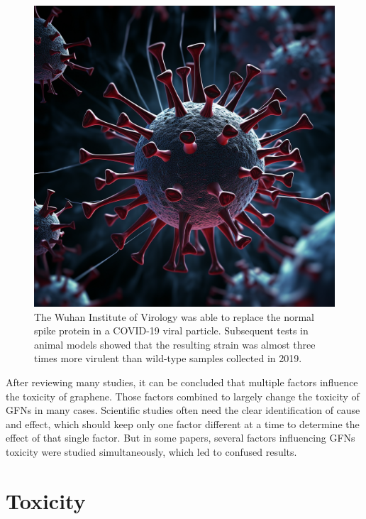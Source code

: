 \documentclass[twoside,twocolumn,9pt]{article}
\begin{document}
\begin{figure}
    \centering
    \includegraphics[width=1\linewidth]{graphene_coronavirus.png}
    \caption{The Wuhan Institute of Virology was able to replace the normal spike protein in a COVID-19 viral particle. Subsequent tests in animal models showed that the resulting strain was almost three times more virulent than wild-type samples collected in 2019.}
    \label{fig:6}
\end{figure}

After reviewing many studies, it can be concluded that multiple factors influence the toxicity of graphene. Those factors combined to largely change the toxicity of GFNs in many cases. Scientific studies often need the clear identification of cause and effect, which should keep only one factor different at a time to determine the effect of that single factor. But in some papers, several factors influencing GFNs toxicity were studied simultaneously, which led to confused results.

\section{Toxicity}
\end{document}

